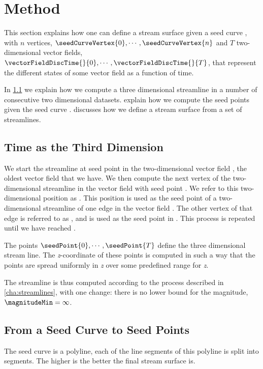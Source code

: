\section{Method}
\label{s:streamsurfaces:method}
This section explains how one can define a stream surface given a seed curve \seedCurve, with $n$ vertices, $\seedCurveVertex{0}, \cdots ,\seedCurveVertex{n}$ and $T$ two-dimensional vector fields, $\vectorFieldDiscTime{}{0}, \cdots, \vectorFieldDiscTime{}{T}$,  that represent the different states of some vector field as a function of time.


In \cref{s:streamsurface:method:time} we explain how we compute a three dimensional streamline in a number of consecutive two dimensional datasets.  explain how we compute the seed points given the seed curve \seedCurve.  discusses how we define a stream surface from a set of streamlines. 

\subsection{Time as the Third Dimension}
\label{s:streamsurface:method:time}
We start the streamline at seed point  in the two-dimensional vector field , \ie the oldest vector field that we have. We then compute the next vertex of the two-dimensional streamline in the vector field  with seed point . We refer to this two-dimensional position as . This position is used as the seed point of a two-dimensional streamline of one edge in the vector field . The other vertex of that edge is referred to as , and is used as the seed point in . This process is repeated until we have reached . 

The points $\seedPoint{0}, \cdots, \seedPoint{T}$ define the three dimensional stream line. The \textit{z}-coordinate of these points is computed in such a way that the points are spread uniformly in \textit{z} over some predefined range for \textit{z}.


The streamline is thus computed according to the process described in \cref{cha:streamlines}, with one change: there is no lower bound for the magnitude, \ie $\magnitudeMin = \infty$.

\subsection{From a Seed Curve to Seed Points}
\label{s:streamsurface:method:seedCurve}
The seed curve is a polyline, each of the line segments of this polyline is split into \resolution segments. The higher \resolution is the better the final stream surface is. 

